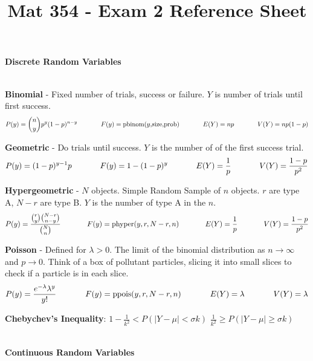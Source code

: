 \documentclass{scrartcl}
\title{Mat 354 - Exam 2 Reference Sheet}
\begin{document}
\begin{Large}\textbf{Discrete Random Variables}\end{Large}\\

\textbf{Binomial} - Fixed number of trials, success or failure. $Y$ is number of trials until first success.
$$P(y) = {n \choose y}p^y(1-p)^{n-y} \text{\hspace{0.5in}} F(y) = \text{pbinom($y$,size,prob)} \text{\hspace{0.5in}} E(Y) = np \text{\hspace{0.5in}} V(Y) = np(1-p)$$

\textbf{Geometric} - Do trials until success. $Y$ is the number of of the first success trial.
$$P(y) = (1-p)^{y-1}p \text{\hspace{0.5in}} F(y) = 1 - (1-p)^y \text{\hspace{0.5in}} E(Y) = \frac{1}{p} \text{\hspace{0.5in}} V(Y) = \frac{1-p}{p^2}$$

\textbf{Hypergeometric} - $N$ objects. Simple Random Sample of $n$ objects. $r$ are type A, $N-r$ are type B. $Y$ is the number of type A in the $n$.
$$P(y) = \frac{{r \choose y}{N-r \choose n-y}}{{N \choose n}} \text{\hspace{0.5in}} F(y) = \text{phyper($y,r,N-r,n$)} \text{\hspace{0.5in}} E(Y) = \frac{1}{p} \text{\hspace{0.5in}} V(Y) = \frac{1-p}{p^2}$$

\textbf{Poisson} - Defined for $\lambda > 0$. The limit of the binomial distribution as $n\rightarrow\infty$ and $p \rightarrow0$. Think of a box of pollutant particles, slicing it into small slices to check if a particle is in each slice.
$$P(y) = \frac{e^{-\lambda}\lambda^y}{y!} \text{\hspace{0.5in}} F(y) = \text{ppois($y,r,N-r,n$)} \text{\hspace{0.5in}} E(Y) = \lambda \text{\hspace{0.5in}} V(Y) = \lambda$$

\textbf{Chebychev's Inequality}:  \hspace{0.5in} $1 - \frac{1}{k^2} < P(|Y-\mu|<\sigma k)$ \hspace{0.5in}$\frac{1}{k^2} \ge P(|Y-\mu|\ge\sigma k)$\\\ \\
\begin{Large}\textbf{Continuous Random Variables}\end{Large}\\
\end{document}
